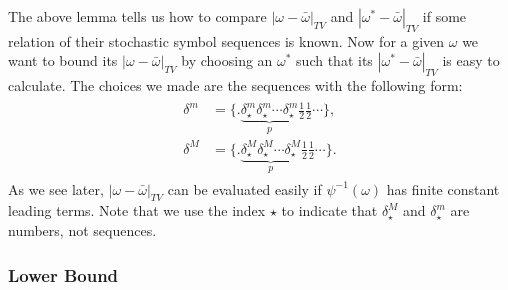 The above lemma tells us how to compare $|\omega-\bar{\omega}|_{TV}$ and $|\omega^*-\bar{\omega}|_{TV}$
if some relation of their stochastic symbol sequences is known. Now for a given $\omega$ we want
to bound its $|\omega-\bar{\omega}|_{TV}$ by choosing an $\omega^*$ such that its
$|\omega^*-\bar{\omega}|_{TV}$ is easy to calculate. The choices we made are the sequences with the
following form:
  \begin{align}
  \begin{split}
  \label{deltamM}
   \delta^m &= \{.\underbrace{\delta^m_{\star} \delta^m_{\star} \cdots \delta^m_{\star}}_{p}\frac{1}{2}\frac{1}{2}\cdots \}, \\
   \delta^M &= \{.\underbrace{\delta^M_{\star} \delta^M_{\star} \cdots \delta^M_{\star}}_{p}\frac{1}{2}\frac{1}{2}\cdots \}.
  \end{split}
  \end{align}
As we see later, $|\omega-\bar{\omega}|_{TV}$ can be evaluated easily if $\psi^{-1}(\omega)$ has finite constant leading terms. Note that we use the index $\star$ to indicate that $\delta_{\star}^M$ and $\delta_{\star}^m$ are numbers, not sequences.

  



\subsubsection{Lower Bound}

